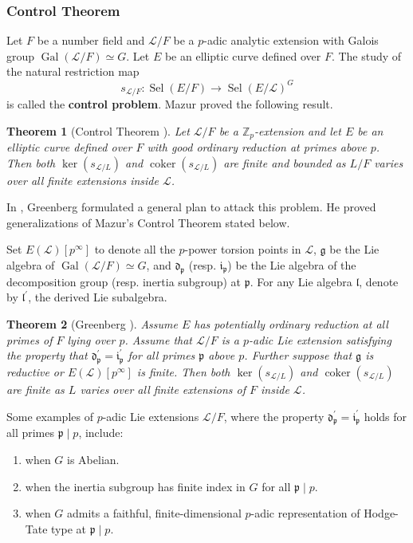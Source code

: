\documentclass{amsart}
\DeclareMathOperator{\Gal}{Gal}
\DeclareMathOperator{\coker}{coker}
\DeclareMathOperator{\Sel}{Sel}
\newcommand{\ZZ}{\mathbb Z}
\newcommand{\fp}{\mathfrak p}
\newcommand{\Linf}{\mathcal{L}}
\newtheorem{Th}{Theorem}[section]
\theoremstyle{definition}
\theoremstyle{remark}
\begin{document}
\subsubsection{\sc Control Theorem}
Let $F$ be a number field and $\Linf/F$ be a $p$-adic analytic extension with Galois group $\Gal(\Linf/F)\simeq G$.
Let $E$ be an elliptic curve defined over $F$.
The study of the natural restriction map
\[
s_{\Linf/F}: \Sel\left(E/F\right) \rightarrow \Sel\left(E/\Linf\right)^{G}
\]
is called the \textbf{control problem}.
Mazur proved the following result.
\begin{Th}[Control Theorem \cite{Maz72}]
Let $\Linf/F$ be a $\ZZ_p$-extension and let $E$ be an elliptic curve defined over $F$ with good ordinary reduction at primes above $p$.
Then both $\ker(s_{\Linf/L})$ and $\coker(s_{\Linf/L})$ are finite and bounded as $L/F$ varies over all finite extensions inside $\Linf$.
\end{Th}

In \cite{Gre03}, Greenberg formulated a general plan to attack this problem.
He proved generalizations of Mazur's Control Theorem stated below.

Set $E(\Linf)[p^\infty]$ to denote all the $p$-power torsion points in $\Linf$, $\mathfrak{g}$ be the Lie algebra of $\Gal(\Linf/F)\simeq G$, and $\mathfrak{d_{p}}$ (resp. $\mathfrak{i_{p}}$) be the Lie algebra of the decomposition group (resp. inertia subgroup) at $\fp$.
For any Lie algebra $\mathfrak{l}$, denote by $\mathfrak{l}^\prime$, the derived Lie subalgebra.

\begin{Th}[Greenberg \cite{Gre03}]
\label{control theorem}
Assume $E$ has potentially ordinary reduction at all primes of $F$ lying over $p$.
Assume that $\Linf/F$ is a $p$-adic Lie extension satisfying the property that $\mathfrak{d^\prime_{p}} = \mathfrak{i^\prime_{p}}$ for all primes $\fp$ above $p$.
Further suppose that $\mathfrak{g}$ is reductive or $E(\Linf)[p^\infty]$ is finite.
Then both $\ker(s_{\Linf/L})$ and $\coker(s_{\Linf/L})$ are finite as $L$ varies over all finite extensions of $F$ inside $\Linf$.
\end{Th}

Some examples of $p$-adic Lie extensions $\Linf/F$, where the property $\mathfrak{d^\prime_{p}} = \mathfrak{i^\prime_{p}}$ holds for all primes $\fp\mid p$, include:
\begin{enumerate}
\item when $G$ is Abelian.
\item when the inertia subgroup has finite index in $G$ for all $\fp\mid p$.
\item when $G$ admits a faithful, finite-dimensional $p$-adic representation of Hodge-Tate type at $\fp\mid p$.
\end{enumerate}
\end{document}
